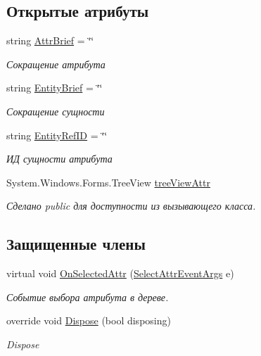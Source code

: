 \subsection*{Открытые атрибуты}
\begin{DoxyCompactItemize}
\item 
string \mbox{\hyperlink{class_f_b_a_1_1_comp_attr_tree_f_b_a_a7e7b5e30fca4dbcdd634ab40e21d87c0}{Attr\+Brief}} = \char`\"{}\char`\"{}
\begin{DoxyCompactList}\small\item\em Сокращение атрибута \end{DoxyCompactList}\item 
string \mbox{\hyperlink{class_f_b_a_1_1_comp_attr_tree_f_b_a_a9becc861067893a37fb9a1ee72d27ece}{Entity\+Brief}} = \char`\"{}\char`\"{}
\begin{DoxyCompactList}\small\item\em Сокращение сущности \end{DoxyCompactList}\item 
string \mbox{\hyperlink{class_f_b_a_1_1_comp_attr_tree_f_b_a_ac19304bab81f6d44c7a3378974c6e5a8}{Entity\+Ref\+ID}} = \char`\"{}\char`\"{}
\begin{DoxyCompactList}\small\item\em ИД сущности атрибута \end{DoxyCompactList}\item 
System.\+Windows.\+Forms.\+Tree\+View \mbox{\hyperlink{class_f_b_a_1_1_comp_attr_tree_f_b_a_a74bba1113ef5eb731a015ca34a776cf7}{tree\+View\+Attr}}
\begin{DoxyCompactList}\small\item\em Сделано public для доступности из вызывающего класса. \end{DoxyCompactList}\end{DoxyCompactItemize}
\subsection*{Защищенные члены}
\begin{DoxyCompactItemize}
\item 
virtual void \mbox{\hyperlink{class_f_b_a_1_1_comp_attr_tree_f_b_a_ac5b7cef9aaa147518ad06ba6796e8e1d}{On\+Selected\+Attr}} (\mbox{\hyperlink{class_f_b_a_1_1_select_attr_event_args}{Select\+Attr\+Event\+Args}} e)
\begin{DoxyCompactList}\small\item\em Событие выбора атрибута в дереве. \end{DoxyCompactList}\item 
override void \mbox{\hyperlink{class_f_b_a_1_1_comp_attr_tree_f_b_a_a6fe23dda820285dd1d4fcaec6fac70c1}{Dispose}} (bool disposing)
\begin{DoxyCompactList}\small\item\em Dispose \end{DoxyCompactList}\end{DoxyCompactItemize}
